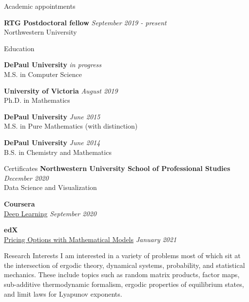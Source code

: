 \documentclass{resume} %
\begin{document}
	
\begin{rSection}{Academic appointments}
	
	{\bf RTG Postdoctoral fellow} \hfill {\em September 2019 - present} \\ 
	Northwestern University
	
\end{rSection}


\begin{rSection}{Education}
	
{\bf DePaul University} \hfill {\em in progress} \\ 
M.S. in Computer Science
	
{\bf University of Victoria} \hfill {\em August 2019} \\ 
Ph.D. in Mathematics
	
{\bf DePaul University} \hfill {\em June 2015} \\ 
M.S. in Pure Mathematics (with distinction)	

{\bf DePaul University} \hfill {\em June 2014} \\ 
B.S. in Chemistry and Mathematics 

\end{rSection}

\begin{rSection}{Certificates}
	{\bf Northwestern University School of Professional Studies} \hfill {\em December 2020} \\ 
	Data Science and Visualization
	
	{\bf Coursera}  \\ 
	\href{https://coursera.org/share/f9a0d707acde360e04a6f75aa7adecba}{Deep Learning} \hfill \hfill {\em September 2020}
	
	{\bf edX}  \\ 
	\href{#}{Pricing Options with Mathematical Models} \hfill \hfill {\em January 2021}
\end{rSection}

\begin{rSection}{Research Interests}
	I am interested in a variety of problems most of which sit at the intersection of ergodic theory, dynamical systems, probability, and statistical mechanics. These include topics such as random matrix products, factor maps, sub-additive thermodynamic formalism, ergodic properties of equilibrium states, and limit laws for Lyapunov exponents.
\end{rSection}
\end{document}
